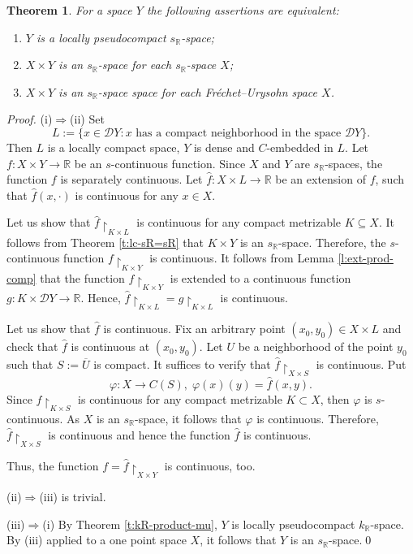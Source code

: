 \documentclass[preprint,11pt]{elsarticle}
\newtheorem{theorem}{Theorem}[section]
\numberwithin{equation}{section}
\numberwithin{theorem}{section}
\newcommand{\IR}{\mathbb{R}}
\newcommand{\DD}{\mathcal{D}}
\begin{document}
\begin{theorem} \label{p:sR-product}
For a space $Y$ the following assertions are equivalent:
\begin{enumerate}
\item[{\rm (i)}] $Y$ is a locally pseudocompact $s_\IR$-space;
\item[{\rm (ii)}] $X\times Y$ is an $s_\IR$-space for each $s_\IR$-space $X$;
\item[{\rm (iii)}] $X\times Y$ is an $s_\IR$-space space for each Fr\'{e}chet--Urysohn space $X$.
\end{enumerate}
\end{theorem}

\begin{proof}
(i)$\Rightarrow$(ii) Set
\[
L:=\{x \in \DD Y: x \mbox{ has a compact neighborhood in the space } \DD Y\}.
\]
Then $L$ is a locally compact space, $Y$ is dense and $C$-embedded in $L$. Let $f: X\times Y\to\IR$ be an $s$-continuous function. Since $X$ and $Y$ are $s_\IR$-spaces, the function $f$ is separately continuous. Let $\hat f: X\times L\to \IR$ be an extension of $f$, such that $\hat f(x,\cdot)$ is continuous for any $x\in X$.

Let us show that $\hat f{\restriction}_{K \times L}$ is continuous for any compact metrizable $K\subseteq X$.
It follows from Theorem \ref{t:lc-sR=sR} that $K\times Y$ is an $s_\IR$-space.
Therefore, the $s$-continuous function $f{\restriction}_{K\times Y}$ is continuous.
It follows from Lemma \ref{l:ext-prod-comp} that the function $f{\restriction}_{K\times Y}$ is extended to a continuous function $g: K\times \DD Y\to \IR$. Hence, $\hat f{\restriction}_{K \times L}=g{\restriction}_{K \times L}$ is continuous.

Let us show that $\hat f$ is continuous. Fix an arbitrary point $(x_0,y_0)\in X\times L$ and check that $\hat f$ is continuous at $(x_0,y_0)$. Let $U$ be a neighborhood of the point $y_0$ such that $S:=\overline{U}$ is compact. It suffices to verify that $\hat f{\restriction}_{X\times S}$ is continuous.
Put
\[
\varphi: X\to C(S),\; \varphi(x)(y)=\hat f(x,y).
\]
Since $\hat f{\restriction}_{K \times S}$ is continuous for any compact metrizable $K\subset X$, then $\varphi$ is $s$-continuous. As $X$ is an $s_\IR$-space, it follows that $\varphi$ is continuous. Therefore, $\hat f{\restriction}_{X\times S}$ is continuous and hence the function $\hat f$ is continuous.

Thus, the function $f=\hat f{\restriction}_{X\times Y}$ is continuous, too.
\smallskip

(ii)$\Rightarrow$(iii) is trivial.
\smallskip

(iii)$\Rightarrow$(i) By Theorem \ref{t:kR-product-mu},  $Y$ is locally pseudocompact $k_\IR$-space. By (iii) applied to a one point space $X$,  it follows that  $Y$ is an $s_\IR$-space.\qed
\end{proof}
\end{document}
